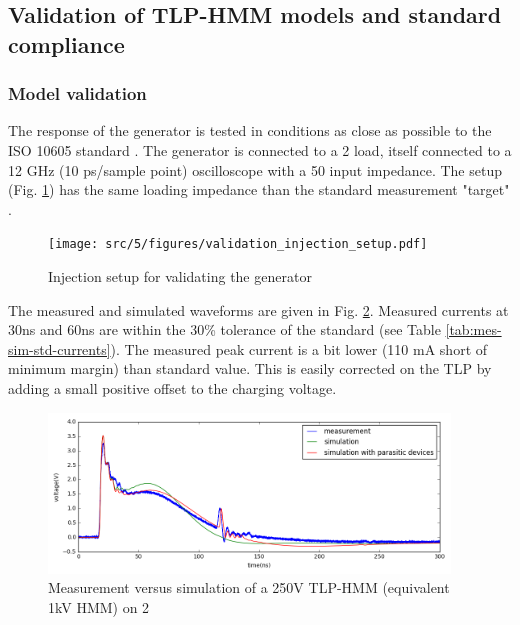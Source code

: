 \subsection{Validation of TLP-HMM models and standard compliance}

\subsubsection{Model validation}

The response of the generator is tested in conditions as close as possible to the ISO 10605 standard \cite{iso10605}.
The generator is connected to a 2\textOmega{} load, itself connected to a 12 GHz (10 ps/sample point) oscilloscope with a 50\textOmega{} input impedance.
The setup (Fig. \ref{fig:injection_setup_validation}) has the same loading impedance than the standard measurement "target" \cite{iso10605, iec61000-4-2}.

\begin{figure}[!h]
  \centering
  \texttt{[image: src/5/figures/validation\_injection\_setup.pdf]}
  \caption{Injection setup for validating the generator}
  \label{fig:injection_setup_validation}
\end{figure}

The measured and simulated waveforms are given in Fig. \ref{fig:tlp_hmm_waveforms}.
Measured currents at 30ns and 60ns are within the 30\% tolerance of the standard (see Table \ref{tab:mes-sim-std-currents}).
The measured peak current is a bit lower (110 mA short of minimum margin) than standard value.
This is easily corrected on the TLP by adding a small positive offset to the charging voltage.

\begin{figure}[!h]
  \centering
  \includegraphics[width=0.95\textwidth]{src/5/figures/tlp_hmm_waveforms.png}
  \caption{Measurement versus simulation of a 250V TLP-HMM (equivalent 1kV HMM) on 2\textOmega{}}
  \label{fig:tlp_hmm_waveforms}
\end{figure}

